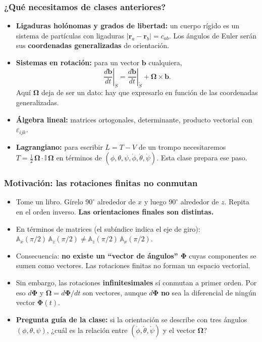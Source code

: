 \documentclass[spanish]{beamer}
\newcommand{\vect}[1]{\mathbf{#1}}              %
\newcommand{\bOmega}{\bm{\Omega}}               %
\newcommand{\dPhi}{d\bm{\Phi}}                  %
\newcommand{\Rot}{\mathbb{A}}                   %
\newcommand{\Inercia}{\mathbb{I}}               %
\newcommand{\Slab}{S}                           %
\newcommand{\Scue}{\tilde{S}}                   %
\begin{document}
\begin{frame}
  \frametitle{¿Qué necesitamos de clases anteriores?}
  \begin{itemize}
    \item<1-> \textbf{Ligaduras holónomas y grados de libertad:} un cuerpo rígido
          es un sistema de partículas con ligaduras $|\vect{r}_a-\vect{r}_b| = c_{ab}$.
          Los ángulos de Euler serán sus \textbf{coordenadas generalizadas} de orientación.
    \item<2-> \textbf{Sistemas en rotación:} para un vector $\vect{b}$ cualquiera,
          \[
            \left.\frac{d\vect{b}}{dt}\right|_{\Slab}
            = \left.\frac{d\vect{b}}{dt}\right|_{\Scue} + \bOmega\times\vect{b}.
          \]
          Aquí $\bOmega$ deja de ser un dato: hay que expresarlo en función
          de las coordenadas generalizadas.
    \item<3-> \textbf{Álgebra lineal:} matrices ortogonales, determinante,
          producto vectorial con $\varepsilon_{ijk}$.
    \item<4-> \textbf{Lagrangiano:} para escribir $L=T-V$ de un trompo necesitaremos
          $T=\tfrac12\,\bOmega\cdot\Inercia\,\bOmega$ en términos de
          $(\phi,\theta,\psi,\dot\phi,\dot\theta,\dot\psi)$. Esta clase prepara ese paso.
  \end{itemize}
\end{frame}

\begin{frame}
  \frametitle{Motivación: las rotaciones finitas no conmutan}
  \begin{itemize}
    \item<1-> Tome un libro. Gírelo $90^\circ$ alrededor de $x$ y luego $90^\circ$
          alrededor de $z$. Repita en el orden inverso. \textbf{Las orientaciones
          finales son distintas.}
    \item<2-> En términos de matrices (el subíndice indica el eje de giro): $\Rot_x(\pi/2)\,\Rot_z(\pi/2)\neq
          \Rot_z(\pi/2)\,\Rot_x(\pi/2)$.
    \item<3-> Consecuencia: \textbf{no existe un ``vector de ángulos'' $\bm{\Phi}$}
          cuyas componentes se sumen como vectores. Las rotaciones finitas no forman un
          espacio vectorial.
    \item<4-> Sin embargo, las rotaciones \textbf{infinitesimales} sí conmutan a primer
          orden. Por eso $\dPhi$ y $\bOmega=\dPhi/dt$ son vectores, aunque
          $\dPhi$ \textbf{no} sea la diferencial de ningún vector $\bm{\Phi}(t)$.
    \item<5-> \textbf{Pregunta guía de la clase:} si la orientación se describe con tres
          ángulos $(\phi,\theta,\psi)$, ¿cuál es la relación entre
          $(\dot\phi,\dot\theta,\dot\psi)$ y el vector $\bOmega$?
  \end{itemize}
\end{frame}
\end{document}
